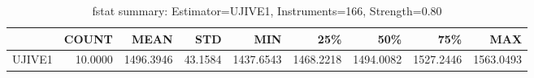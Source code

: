 \begin{table}[ht]
\centering
\caption{fstat summary: Estimator=UJIVE1, Instruments=166, Strength=0.80}
\begin{tabular}{lrrrrrrrr}
\toprule
 & COUNT & MEAN & STD & MIN & 25\% & 50\% & 75\% & MAX \\
\midrule
UJIVE1 & 10.0000 & 1496.3946 & 43.1584 & 1437.6543 & 1468.2218 & 1494.0082 & 1527.2446 & 1563.0493 \\
\bottomrule
\end{tabular}
\end{table}
